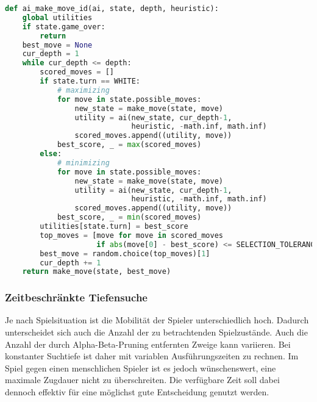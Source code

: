 \begin{lstlisting}[language=Python]
def ai_make_move_id(ai, state, depth, heuristic):
    global utilities
    if state.game_over:
        return
    best_move = None
    cur_depth = 1
    while cur_depth <= depth:
        scored_moves = []
        if state.turn == WHITE:
            # maximizing
            for move in state.possible_moves:
                new_state = make_move(state, move)
                utility = ai(new_state, cur_depth-1,
                             heuristic, -math.inf, math.inf)
                scored_moves.append((utility, move))
            best_score, _ = max(scored_moves)
        else:
            # minimizing
            for move in state.possible_moves:
                new_state = make_move(state, move)
                utility = ai(new_state, cur_depth-1,
                             heuristic, -math.inf, math.inf)
                scored_moves.append((utility, move))
            best_score, _ = min(scored_moves)
        utilities[state.turn] = best_score
        top_moves = [move for move in scored_moves
                     if abs(move[0] - best_score) <= SELECTION_TOLERANCE]
        best_move = random.choice(top_moves)[1]
        cur_depth += 1
    return make_move(state, best_move)
\end{lstlisting}

\hypertarget{zeitbeschruxe4nkte-tiefensuche}{%
\subsubsection{Zeitbeschränkte
Tiefensuche}\label{zeitbeschruxe4nkte-tiefensuche}}

Je nach Spielsituation ist die Mobilität der Spieler unterschiedlich
hoch. Dadurch unterscheidet sich auch die Anzahl der zu betrachtenden
Spielzustände. Auch die Anzahl der durch Alpha-Beta-Pruning entfernten
Zweige kann variieren. Bei konstanter Suchtiefe ist daher mit variablen
Ausführungszeiten zu rechnen. Im Spiel gegen einen menschlichen Spieler
ist es jedoch wünschenswert, eine maximale Zugdauer nicht zu
überschreiten. Die verfügbare Zeit soll dabei dennoch effektiv für eine
möglichst gute Entscheidung genutzt werden.

